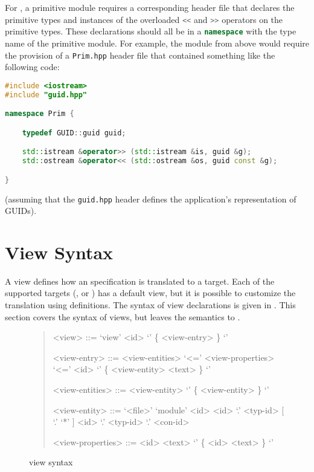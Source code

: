 For \Cplusplus{}, a primitive module requires a corresponding header file that declares
the primitive types and instances of the overloaded \lstinline[language=c++]!<<! and
\lstinline[language=c++]!>>! operators on the primitive types.  These declarations should
all be in a \lstinline[language=c++]!namespace! with the type name of the primitive module.
For example, the module from above would require the provision of a \texttt{Prim.hpp} header
file that contained something like the following code:
%
\begin{code}\begin{lstlisting}[language=c++]
#include <iostream>
#include "guid.hpp"

namespace Prim {

    typedef GUID::guid guid;

    std::istream &operator>> (std::istream &is, guid &g);
    std::ostream &operator<< (std::ostream &os, guid const &g);

}
\end{lstlisting}\end{code}%
(assuming that the \texttt{guid.hpp} header defines the application's representation
of GUIDs).


\section{View Syntax}
\label{sec:view-syntax}

A view defines how an \asdl{} specification is translated to a target.
Each of the supported targets (\eg{}, \sml{} or \Cplusplus{}) has a default
view, but it is possible to customize the translation using 
definitions.
The syntax of view declarations is given in .
This section covers the syntax of views, but leaves the semantics to
.

\begin{figure}[t]
  \begin{quote}
    \begin{grammar}
      <view>        ::= `view' <id> `{' \{ <view-entry> \} `}'

      <view-entry>  ::=  <view-entities> `<=' <view-properties>
         \alt{} `<=' <id> `{' \{ <view-entity> <text> \} `}'

      <view-entities> ::= <view-entity>
         \alt{} `{' \{ <view-entity> \} `}'

      <view-entity> ::= `<file>'
         \alt{} `module' <id>
         \alt{} <id> `.' <typ-id> [ `.' `*' ]
         \alt{} <id> `.' <typ-id> `.' <con-id>

      <view-properties> ::= <id> <text>
          \alt{} `{' \{ <id> <text> \} `}'
    \end{grammar}%
  \end{quote}%
  \caption{\asdl{} view syntax}
  \label{fig:view-syntax}
\end{figure}%

